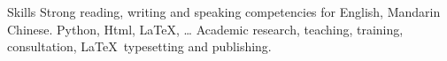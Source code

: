 
\begin{rubric}{Skills}
\entry*[Languages]
	Strong reading, writing and speaking competencies for English, Mandarin Chinese.
	 Python, Html, \LaTeX, \ldots
\entry*[Misc.]
	Academic research, teaching, training, consultation, \LaTeX\ typesetting and publishing.
\end{rubric}
